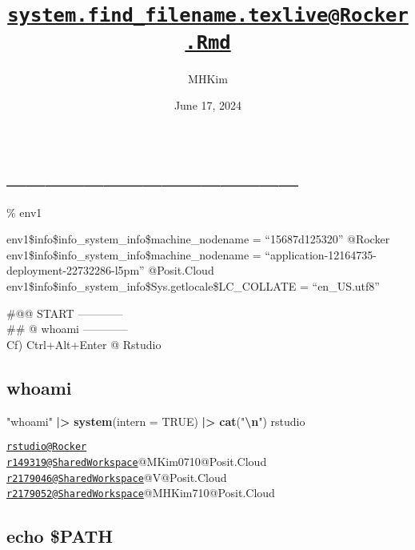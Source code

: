 \documentclass[
]{article}
\title{\href{mailto:system.find_filename.texlive@Rocker.Rmd}{\nolinkurl{system.find\_filename.texlive@Rocker.Rmd}}}
\author{MHKim}
\date{June 17, 2024}
\newenvironment{Shaded}{\begin{snugshade}}{\end{snugshade}}
\newcommand{\AttributeTok}[1]{\textcolor[rgb]{0.13,0.29,0.53}{#1}}
\newcommand{\ConstantTok}[1]{\textcolor[rgb]{0.56,0.35,0.01}{#1}}
\newcommand{\FunctionTok}[1]{\textcolor[rgb]{0.13,0.29,0.53}{\textbf{#1}}}
\newcommand{\NormalTok}[1]{#1}
\newcommand{\SpecialCharTok}[1]{\textcolor[rgb]{0.81,0.36,0.00}{\textbf{#1}}}
\newcommand{\StringTok}[1]{\textcolor[rgb]{0.31,0.60,0.02}{#1}}
\begin{document}
\maketitle

{
\setcounter{tocdepth}{6}
\tableofcontents
}
\hypertarget{section}{%
\section{\_\_\_\_\_\_\_\_\_\_\_\_\_\_\_}\label{section}}

\% env1~

env1\$info\$info\_system\_info\$machine\_nodename = ``15687d125320''
@Rocker\\
env1\$info\$info\_system\_info\$machine\_nodename =
``application-12164735-deployment-22732286-l5pm'' @Posit.Cloud\\
env1\$info\$info\_system\_info\$Sys.getlocale\$LC\_COLLATE =
``en\_US.utf8''

\#@@ START ------------\\
\#\# @ whoami ------------\\
Cf) Ctrl+Alt+Enter @ Rstudio

\hypertarget{whoami}{%
\subsection{whoami}\label{whoami}}

\begin{Shaded}
\begin{Highlighting}[]
\StringTok{"whoami"} \SpecialCharTok{|\textgreater{}}
    \FunctionTok{system}\NormalTok{(}\AttributeTok{intern =} \ConstantTok{TRUE}\NormalTok{) }\SpecialCharTok{|\textgreater{}}
    \FunctionTok{cat}\NormalTok{(}\StringTok{"}\SpecialCharTok{\textbackslash{}n}\StringTok{"}\NormalTok{)}
\NormalTok{rstudio }
\end{Highlighting}
\end{Shaded}

\href{mailto:rstudio@Rocker}{\nolinkurl{rstudio@Rocker}}\\
\href{mailto:r149319@SharedWorkspace}{\nolinkurl{r149319@SharedWorkspace}}@MKim0710@Posit.Cloud\\
\href{mailto:r2179046@SharedWorkspace}{\nolinkurl{r2179046@SharedWorkspace}}@V@Posit.Cloud\\
\href{mailto:r2179052@SharedWorkspace}{\nolinkurl{r2179052@SharedWorkspace}}@MHKim710@Posit.Cloud

\hypertarget{echo-path}{%
\subsection{echo \$PATH}\label{echo-path}}
\end{document}
